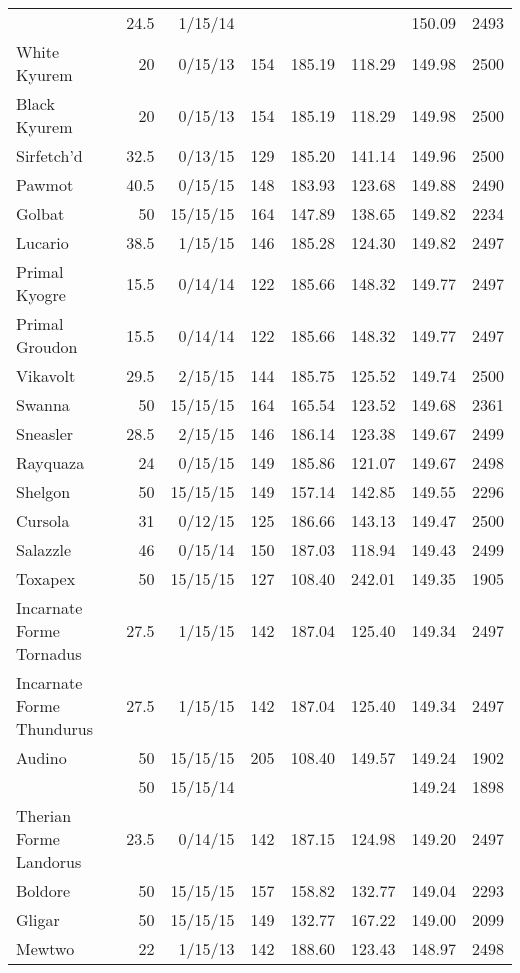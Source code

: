 \begin{longtable}{lrrrrrrr}
 & 24.5 & 1/15/14 & & & & 150.09 & 2493\\
White Kyurem & 20 & 0/15/13 & 154 & 185.19 & 118.29 & 149.98 & 2500\\
Black Kyurem & 20 & 0/15/13 & 154 & 185.19 & 118.29 & 149.98 & 2500\\
Sirfetch'd & 32.5 & 0/13/15 & 129 & 185.20 & 141.14 & 149.96 & 2500\\
Pawmot & 40.5 & 0/15/15 & 148 & 183.93 & 123.68 & 149.88 & 2490\\
Golbat & 50 & 15/15/15 & 164 & 147.89 & 138.65 & 149.82 & 2234\\
Lucario & 38.5 & 1/15/15 & 146 & 185.28 & 124.30 & 149.82 & 2497\\
Primal Kyogre & 15.5 & 0/14/14 & 122 & 185.66 & 148.32 & 149.77 & 2497\\
Primal Groudon & 15.5 & 0/14/14 & 122 & 185.66 & 148.32 & 149.77 & 2497\\
Vikavolt & 29.5 & 2/15/15 & 144 & 185.75 & 125.52 & 149.74 & 2500\\
Swanna & 50 & 15/15/15 & 164 & 165.54 & 123.52 & 149.68 & 2361\\
Sneasler & 28.5 & 2/15/15 & 146 & 186.14 & 123.38 & 149.67 & 2499\\
Rayquaza & 24 & 0/15/15 & 149 & 185.86 & 121.07 & 149.67 & 2498\\
Shelgon & 50 & 15/15/15 & 149 & 157.14 & 142.85 & 149.55 & 2296\\
Cursola & 31 & 0/12/15 & 125 & 186.66 & 143.13 & 149.47 & 2500\\
Salazzle & 46 & 0/15/14 & 150 & 187.03 & 118.94 & 149.43 & 2499\\
Toxapex & 50 & 15/15/15 & 127 & 108.40 & 242.01 & 149.35 & 1905\\
Incarnate Forme Tornadus & 27.5 & 1/15/15 & 142 & 187.04 & 125.40 & 149.34 & 2497\\
Incarnate Forme Thundurus & 27.5 & 1/15/15 & 142 & 187.04 & 125.40 & 149.34 & 2497\\
Audino & 50 & 15/15/15 & 205 & 108.40 & 149.57 & 149.24 & 1902\\
 & 50 & 15/15/14 & & & & 149.24 & 1898\\
Therian Forme Landorus & 23.5 & 0/14/15 & 142 & 187.15 & 124.98 & 149.20 & 2497\\
Boldore & 50 & 15/15/15 & 157 & 158.82 & 132.77 & 149.04 & 2293\\
Gligar & 50 & 15/15/15 & 149 & 132.77 & 167.22 & 149.00 & 2099\\
Mewtwo & 22 & 1/15/13 & 142 & 188.60 & 123.43 & 148.97 & 2498\\

\end{longtable}
